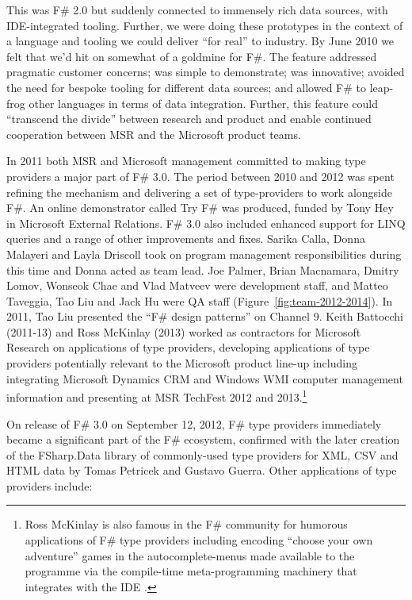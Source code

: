 \documentclass[acmsmall,screen]{acmart}
\begin{document}
This was F\# 2.0 but suddenly connected to immensely rich data sources, with IDE-integrated tooling.  Further, we were
doing these prototypes in the context of a language and tooling we could deliver “for real” to industry.  By June 2010 we
felt that we’d hit on somewhat of a goldmine for F\#. The feature addressed pragmatic customer concerns; was simple to
demonstrate; was innovative; avoided the need for bespoke tooling for different data sources; and allowed F\# to leap-frog
other languages in terms of data integration. Further, this feature could “transcend the divide” between research and product
and enable continued cooperation between MSR and the Microsoft product teams. 

In 2011 both MSR and Microsoft management committed to making type providers a major part of F\# 3.0. The period
between 2010 and 2012 was spent refining the mechanism and delivering a set of type-providers to work alongside F\#.
An online demonstrator called Try F\# was produced, funded by Tony Hey in Microsoft External Relations. F\# 3.0 also
included enhanced support for LINQ queries and a range of other improvements and fixes. Sarika Calla, Donna Malayeri
and Layla Driscoll took on program management responsibilities during this time and Donna acted as team lead.  Joe Palmer, Brian Macnamara, Dmitry
Lomov, Wonseok Chae and Vlad Matveev were development staff, and Matteo Taveggia, Tao Liu and
Jack Hu were QA staff (Figure~\ref{fig:team-2012-2014}). In 2011, Tao Liu presented the “F\# design patterns” on Channel 9.
Keith Battocchi (2011-13) and Ross McKinlay (2013) worked as contractors for Microsoft Research on applications of type
providers, developing applications of type providers potentially relevant to the Microsoft product line-up including integrating
Microsoft Dynamics CRM and Windows WMI computer management information and presenting at MSR TechFest 2012 and
2013.\footnote{Ross McKinlay is also famous in the F\# community for humorous applications of F\# type providers
including encoding “choose your own adventure” games in the autocomplete-menus made available to the programme
via the compile-time meta-programming machinery that integrates with the IDE \citep{RefChoose}.}

On release of F\# 3.0 on September 12, 2012,  F\# type providers immediately became a significant part of the F\# ecosystem, confirmed with the later creation of the FSharp.Data library of commonly-used type providers for XML, CSV and HTML data by Tomas Petricek and Gustavo Guerra.  Other applications of type providers include:
\end{document}
